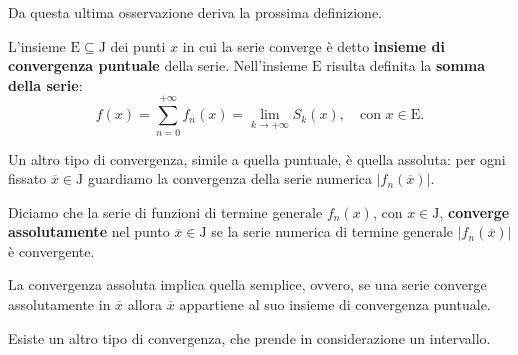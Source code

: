 \documentclass[../../analisi2]{subfiles}
\begin{document}
        Da questa ultima osservazione deriva la prossima definizione.
        
        \begin{definizione}
            L'insieme \(\mathrm{E} \subseteq \mathrm{J}\) dei punti \(x\) in cui la serie converge è detto \textbf{insieme di
            convergenza puntuale} della serie. Nell'insieme \(\mathrm{E}\) risulta definita la \textbf{somma della serie}:
            \[
                f(x) = \sum_{n = 0}^{+\infty} f_n(x) = \lim_{k \to +\infty} S_k (x), \quad \text{con } x \in \mathrm{E}.
            \]
        \end{definizione}

        Un altro tipo di convergenza, simile a quella puntuale, è quella assoluta: per ogni fissato \(\overline{x} \in \mathrm{J}\)
        guardiamo la convergenza della serie numerica \(\left|f_n(\overline{x})\right|\).
        
        \begin{definizione}
            Diciamo che la serie di funzioni di termine generale \(f_n(x)\), con \(x \in \mathrm{J}\), \textbf{converge assolutamente}
            nel punto \(\overline{x} \in \mathrm{J}\) se la serie numerica di termine generale \(\left|f_n(\overline{x})\right|\) è
            convergente.
        \end{definizione}
        \begin{osservazione}
            La convergenza assoluta implica quella semplice, ovvero, se una serie converge assolutamente in \(\overline{x}\) allora
            \(\overline{x}\) appartiene al suo insieme di convergenza puntuale.
        \end{osservazione}

        Esiste un altro tipo di convergenza, che prende in considerazione un intervallo.
        
\end{document}
